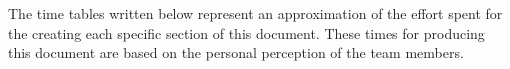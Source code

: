 The time tables written below represent an approximation of the effort spent for the
creating each specific section of this document. These times for producing this document are based on the personal perception of the team members.

\begin{table}[h!]
  \centering
  \caption{Effort Spent by Students}
  \label{tab:effort_table}
\end{table}

